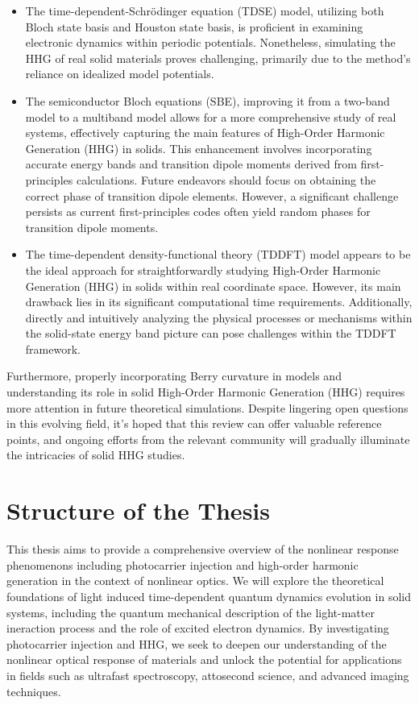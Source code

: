 \begin{itemize}
    \item The time-dependent-Schr\"odinger equation (\gls{TDSE}) model, utilizing both Bloch state basis and Houston state basis, is proficient in examining electronic dynamics within periodic potentials. Nonetheless, simulating the HHG of real solid materials proves challenging, primarily due to the method's reliance on idealized model potentials.
    \item The semiconductor Bloch equations (\gls{SBE}), improving it from a two-band model to a multiband model allows for a more comprehensive study of real systems, effectively capturing the main features of High-Order Harmonic Generation (HHG) in solids. This enhancement involves incorporating accurate energy bands and transition dipole moments derived from first-principles calculations. Future endeavors should focus on obtaining the correct phase of transition dipole elements. However, a significant challenge persists as current first-principles codes often yield random phases for transition dipole moments.
    \item The time-dependent density-functional theory (\gls{TDDFT}) model appears to be the ideal approach for straightforwardly studying High-Order Harmonic Generation (HHG) in solids within real coordinate space. However, its main drawback lies in its significant computational time requirements. Additionally, directly and intuitively analyzing the physical processes or mechanisms within the solid-state energy band picture can pose challenges within the TDDFT framework.
\end{itemize}
Furthermore, properly incorporating Berry curvature in models and understanding its role in solid High-Order Harmonic Generation (HHG) requires more attention in future theoretical simulations. Despite lingering open questions in this evolving field, it's hoped that this review can offer valuable reference points, and ongoing efforts from the relevant community will gradually illuminate the intricacies of solid HHG studies.
\section{Structure of the Thesis}
This thesis aims to provide a comprehensive overview of the nonlinear response phenomenons
including photocarrier injection and high-order harmonic generation in the context of nonlinear
optics. We will explore the theoretical foundations of light induced time-dependent quantum
dynamics evolution in solid systems,
including the quantum mechanical description of the light-matter ineraction process and the role of
excited electron dynamics.  By investigating photocarrier injection and HHG, we seek to deepen our understanding of the nonlinear optical response of materials and unlock the potential for applications in fields such as ultrafast spectroscopy, attosecond science, and advanced imaging techniques.

